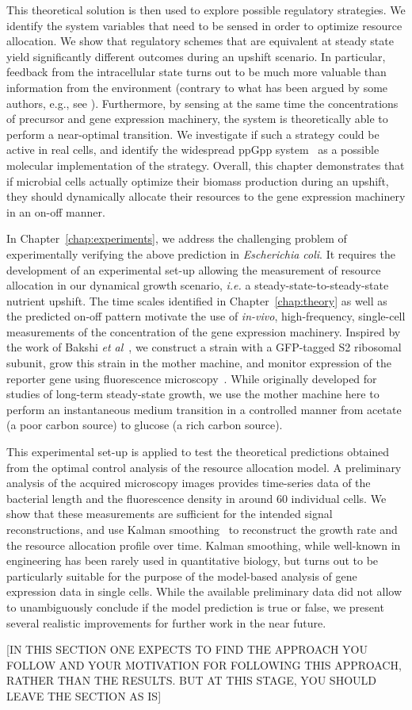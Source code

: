 This theoretical solution is then used to explore possible regulatory strategies.
We identify the system variables that need to be sensed in order to optimize resource allocation.
We show that regulatory schemes that are equivalent at steady state yield significantly different outcomes during an upshift scenario.
In particular, feedback from the intracellular state turns out to be much more valuable than information from the environment (contrary to what has been argued by some authors, e.g., see \cite{levy_coordination_2009}).
Furthermore, by sensing at the same time the concentrations of precursor and gene expression machinery, the system is theoretically able to perform a near-optimal transition.
We investigate if such a strategy could be active in real cells, and identify the widespread ppGpp system~\cite{bosdriesz_how_2015} as a possible molecular implementation of the strategy.
Overall, this chapter demonstrates that if microbial cells actually optimize their biomass production during an upshift, they should dynamically allocate their resources to the gene expression machinery in an on-off manner.

In Chapter~\ref{chap:experiments}, we address the challenging problem of experimentally verifying the above prediction in \textit{Escherichia coli}.
It requires the development of an experimental set-up allowing the measurement of resource allocation in our dynamical growth scenario, \textit{i.e.} a steady-state-to-steady-state nutrient upshift.
The time scales identified in Chapter~\ref{chap:theory} as well as the predicted on-off pattern motivate the use of \textit{in-vivo}, high-frequency, single-cell measurements of the concentration of the gene expression machinery.
Inspired by the work of Bakshi \textit{et al}~\cite{bakshi_superresolution_2012}, we construct a strain with a GFP-tagged S2 ribosomal subunit, grow this strain in the mother machine, and monitor expression of the reporter gene using fluorescence microscopy~\cite{wang_robust_2010}.
While originally developed for studies of long-term steady-state growth, we use the mother machine here to perform an instantaneous medium transition in a controlled manner from acetate (a poor carbon source) to glucose (a rich carbon source).

This experimental set-up is applied to test the theoretical predictions obtained from the optimal control analysis of the resource allocation model.
A preliminary analysis of the acquired microscopy images provides time-series data of the bacterial length and the fluorescence density in around 60 individual cells.
We show that these measurements are sufficient for the intended signal reconstructions, and use Kalman smoothing~\cite{kailath_linear_2000,jazwinski_stochastic_2007} to reconstruct the growth rate and the resource allocation profile over time.
Kalman smoothing, while well-known in engineering has been rarely used in quantitative biology, but turns out to be particularly suitable for the purpose of the model-based analysis of gene expression data in single cells.
While the available preliminary data did not allow to unambiguously conclude if the model prediction is true or false, we present several realistic improvements for further work in the near future. 

[IN THIS SECTION ONE EXPECTS TO FIND THE APPROACH YOU FOLLOW AND YOUR MOTIVATION FOR FOLLOWING THIS APPROACH, RATHER THAN THE RESULTS. BUT AT THIS STAGE, YOU SHOULD LEAVE THE SECTION AS IS]
